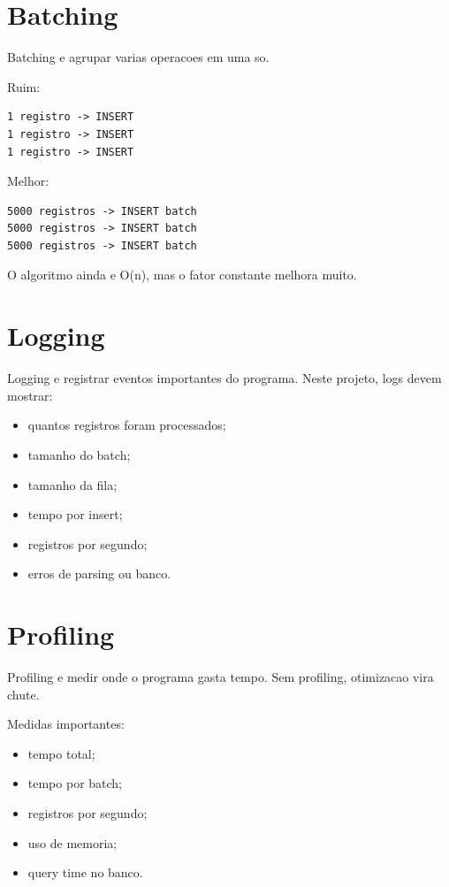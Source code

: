 \section{Batching}

Batching e agrupar varias operacoes em uma so.

Ruim:

\begin{verbatim}
1 registro -> INSERT
1 registro -> INSERT
1 registro -> INSERT
\end{verbatim}

Melhor:

\begin{verbatim}
5000 registros -> INSERT batch
5000 registros -> INSERT batch
5000 registros -> INSERT batch
\end{verbatim}

O algoritmo ainda e O(n), mas o fator constante melhora muito.

\section{Logging}

Logging e registrar eventos importantes do programa. Neste projeto, logs devem mostrar:

\begin{itemize}
  \item quantos registros foram processados;
  \item tamanho do batch;
  \item tamanho da fila;
  \item tempo por insert;
  \item registros por segundo;
  \item erros de parsing ou banco.
\end{itemize}

\section{Profiling}

Profiling e medir onde o programa gasta tempo. Sem profiling, otimizacao vira chute.

Medidas importantes:

\begin{itemize}
  \item tempo total;
  \item tempo por batch;
  \item registros por segundo;
  \item uso de memoria;
  \item query time no banco.
\end{itemize}

